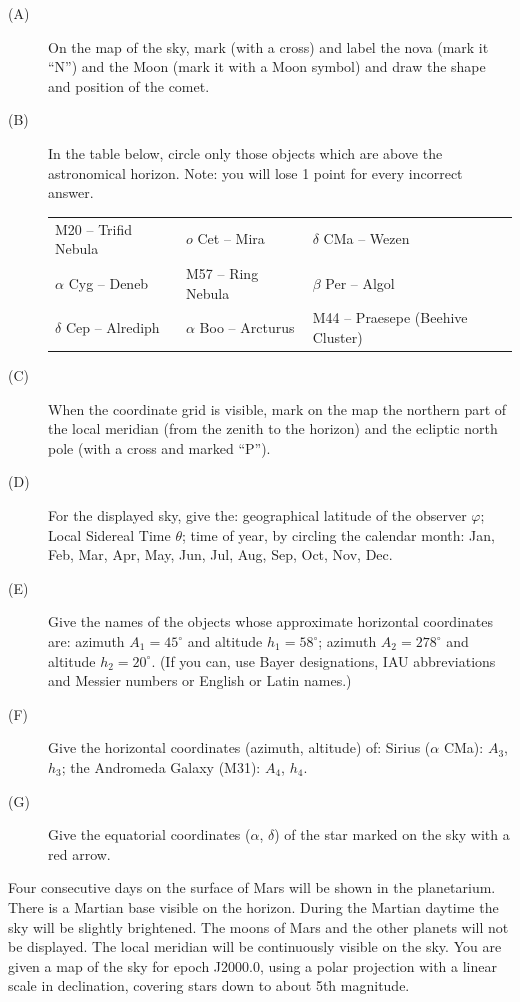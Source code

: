 \begin{description}
\item[(A)] On the map of the sky, mark (with a cross) and label the nova
  (mark it ``N'') and the Moon (mark it with a Moon symbol) and draw the
  shape and position of the comet.
\item[(B)] In the table below, circle only those objects which are above the
  astronomical horizon. Note: you will lose 1 point for every incorrect
  answer.

  \begin{center}
  \begin{tabular}{lll}
  M20 -- Trifid Nebula & $o$ Cet -- Mira & $\delta$ CMa -- Wezen \\
  $\alpha$ Cyg -- Deneb & M57 -- Ring Nebula & $\beta$ Per -- Algol \\
  $\delta$ Cep -- Alrediph & $\alpha$ Boo -- Arcturus &
    M44 -- Praesepe (Beehive Cluster) \\
  \end{tabular}
  \end{center}
\item[(C)] When the coordinate grid is visible, mark on the map the northern
  part of the local meridian (from the zenith to the horizon) and the
  ecliptic north pole (with a cross and marked ``P'').
\item[(D)] For the displayed sky, give the:
  geographical latitude of the observer $\varphi$;
  Local Sidereal Time $\theta$;
  time of year, by circling the calendar month:
  Jan, Feb, Mar, Apr, May, Jun, Jul, Aug, Sep, Oct, Nov, Dec.
\item[(E)] Give the names of the objects whose approximate horizontal
  coordinates are:
  azimuth $A_1 = 45^\circ$ and altitude $h_1 = 58^\circ$;
  azimuth $A_2 = 278^\circ$ and altitude $h_2 = 20^\circ$.
  (If you can, use Bayer designations, IAU abbreviations and Messier numbers
  or English or Latin names.)
\item[(F)] Give the horizontal coordinates (azimuth, altitude) of:
  Sirius ($\alpha$ CMa): $A_3$, $h_3$;
  the Andromeda Galaxy (M31): $A_4$, $h_4$.
\item[(G)] Give the equatorial coordinates ($\alpha$, $\delta$) of the star
  marked on the sky with a red arrow.
\end{description}


Four consecutive days on the surface of Mars will be shown in the
planetarium. There is a Martian base visible on the horizon. During the
Martian daytime the sky will be slightly brightened. The moons of Mars and
the other planets will not be displayed. The local meridian will be
continuously visible on the sky. You are given a map of the sky for epoch
J2000.0, using a polar projection with a linear scale in declination,
covering stars down to about 5th magnitude.

